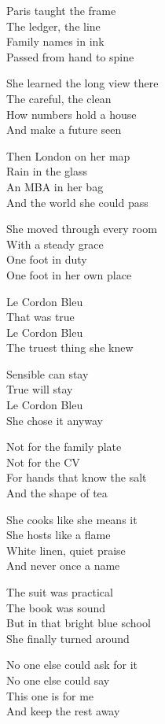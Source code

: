 \begin{lyrics}
Paris taught the frame\\
The ledger, the line\\
Family names in ink\\
Passed from hand to spine

She learned the long view there\\
The careful, the clean\\
How numbers hold a house\\
And make a future seen

Then London on her map\\
Rain in the glass\\
An MBA in her bag\\
And the world she could pass

She moved through every room\\
With a steady grace\\
One foot in duty\\
One foot in her own place

Le Cordon Bleu\\
That was true\\
Le Cordon Bleu\\
The truest thing she knew

Sensible can stay\\
True will stay\\
Le Cordon Bleu\\
She chose it anyway

Not for the family plate\\
Not for the CV\\
For hands that know the salt\\
And the shape of tea

She cooks like she means it\\
She hosts like a flame\\
White linen, quiet praise\\
And never once a name

The suit was practical\\
The book was sound\\
But in that bright blue school\\
She finally turned around

No one else could ask for it\\
No one else could say\\
This one is for me\\
And keep the rest away


\end{lyrics}
